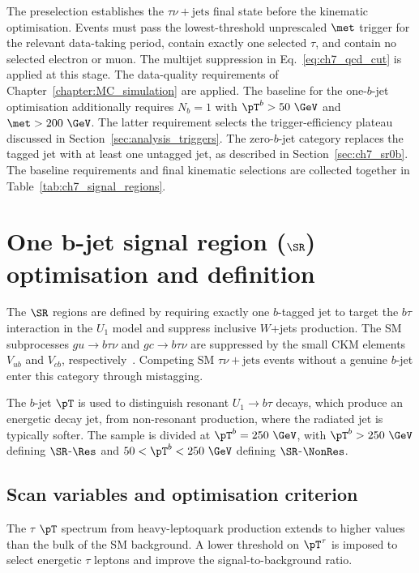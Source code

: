The preselection establishes the $\tau\nu+\mathrm{jets}$ final state before the kinematic optimisation.
Events must pass the lowest-threshold unprescaled $\met$ trigger for the relevant data-taking period, contain exactly one selected $\tau$, and contain no selected electron or muon.
The multijet suppression in Eq.~\ref{eq:ch7_qcd_cut} is applied at this stage.
The data-quality requirements of Chapter~\ref{chapter:MC_simulation} are applied.
The baseline for the one-$b$-jet optimisation additionally requires $N_b=1$ with $\pT^b>50~\GeV$ and $\met>200~\GeV$.
The latter requirement selects the trigger-efficiency plateau discussed in Section~\ref{sec:analysis_triggers}.
The zero-$b$-jet category replaces the tagged jet with at least one untagged jet, as described in Section~\ref{sec:ch7_sr0b}.
The baseline requirements and final kinematic selections are collected together in Table~\ref{tab:ch7_signal_regions}.

\section[One b-jet signal region (SR1b) optimisation and definition]{One b-jet signal region ($\SR$) optimisation and definition}
\label{sec:ch7_sr1b}

The $\SR$ regions are defined by requiring exactly one $b$-tagged jet to target the $b\tau$ interaction in the $U_1$ model and suppress inclusive $W$+jets production.
The SM subprocesses $gu\to b\tau\nu$ and $gc\to b\tau\nu$ are suppressed by the small CKM elements $V_{ub}$ and $V_{cb}$, respectively~\cite{Endo2022NonResonant}.
Competing SM $\tau\nu+\mathrm{jets}$ events without a genuine $b$-jet enter this category through mistagging.

The $b$-jet $\pT$ is used to distinguish resonant $U_1\to b\tau$ decays, which produce an energetic decay jet, from non-resonant production, where the radiated jet is typically softer.
The sample is divided at $\pT^b=250~\GeV$, with $\pT^b>250~\GeV$ defining $\SR$-$\Res$ and $50<\pT^b<250~\GeV$ defining $\SR$-$\NonRes$.

\subsection{Scan variables and optimisation criterion}
\label{subsec:ch7_scan}

The $\tau$ $\pT$ spectrum from heavy-leptoquark production extends to higher values than the bulk of the SM background.
A lower threshold on $\pT^\tau$ is imposed to select energetic $\tau$ leptons and improve the signal-to-background ratio.

